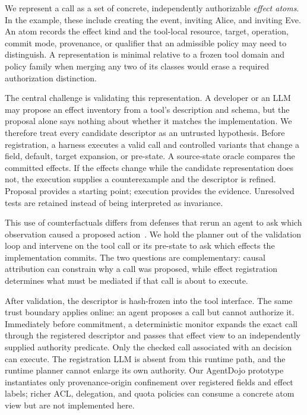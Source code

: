 We represent a call as a set of concrete, independently authorizable
\emph{effect atoms}.  In the example, these include creating the event,
inviting Alice, and inviting Eve.  An atom records the effect kind and the
tool-local resource, target, operation, commit mode, provenance, or qualifier
that an admissible policy may need to distinguish.  A representation is minimal relative
to a frozen tool domain and policy family when merging any two of its classes
would erase a required authorization distinction.

The central challenge is validating this representation.  A developer or an
LLM may propose an effect inventory from a tool's description and schema, but
the proposal alone says nothing about whether it matches the implementation.
We therefore treat every candidate descriptor as an untrusted hypothesis.
Before registration, a harness executes a valid call and controlled variants
that change a field, default, target expansion, or pre-state.  A source-state
oracle compares the committed effects.  If the effects change while the
candidate representation does not, the execution supplies a counterexample
and the descriptor is refined.  Proposal provides a starting point; execution
provides the evidence.  Unresolved tests are retained instead of being
interpreted as invariance.

This use of counterfactuals differs from defenses that rerun an agent to ask
which observation caused a proposed action~\cite{attriguard,causalarmor}.  We
hold the planner out of the validation loop and intervene on the tool call or
its pre-state to ask which effects the implementation commits.  The two
questions are complementary: causal attribution can constrain why a call was
proposed, while effect registration determines what must be mediated if that
call is about to execute.

After validation, the descriptor is hash-frozen into the tool interface.  The
same trust boundary applies online: an agent proposes a call but cannot
authorize it.  Immediately before commitment, a deterministic monitor expands
the exact call through the registered descriptor and passes that effect view to
an independently supplied authority predicate.  Only the checked call
associated with an \Allow{} decision can execute.  The registration LLM is
absent from this runtime path, and the runtime planner cannot enlarge its own
authority.  Our AgentDojo prototype instantiates only provenance-origin
confinement over registered fields and effect labels; richer ACL, delegation,
and quota policies can consume a concrete atom view but are not implemented
here.

